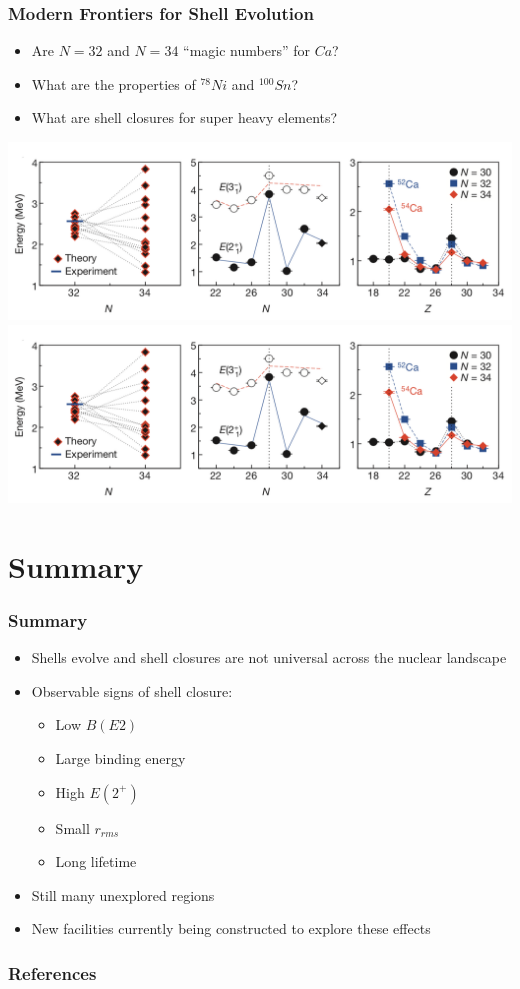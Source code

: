 \documentclass[accentcolor=tud2c,usenames,dvipsnames,colorbacktitle,inverttitle,landscape,german,presentation,t]{tudbeamer}
\begin{document}
  \begin{frame}
    \frametitle{Modern Frontiers for Shell Evolution}
    \begin{itemize}
      \item Are $N=32$ and $N=34$ ``magic numbers'' for $Ca$?
      \item What are the properties of $^{78}Ni$ and $^{100}Sn$?
      \item What are shell closures for super heavy elements?
    \end{itemize}
    \begin{center}
      \includegraphics[trim={0 0 46.5cm 0},clip,height=0.35\textwidth]{images/steppenbeck2}
      \includegraphics[trim={17cm 0 16cm 0},clip,height=0.35\textwidth]{images/steppenbeck2}
      \\ \small{\cite{Steppenbeck:2013mga}}
    \end{center}
  \end{frame}

\section{Summary}

  \begin{frame}
    \frametitle{Summary}
    \begin{itemize}
      \item Shells evolve and shell closures are not universal across the nuclear landscape
      \item Observable signs of shell closure:
      \begin{itemize}
        \item Low $B(E2)$
        \item Large binding energy
        \item High $E(2^+)$
        \item Small $r_{rms}$
        \item Long lifetime
      \end{itemize}
    \item Still many unexplored regions
    \item New facilities currently being constructed to explore these effects
    \end{itemize}
  \end{frame}

  \begin{frame}[allowframebreaks]
    \frametitle{References}
    
    
  \end{frame}
\end{document}
